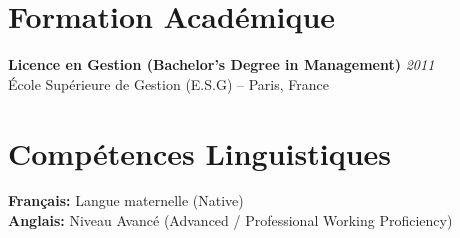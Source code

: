 \documentclass[11pt,a4paper]{article}
\begin{document}
\section*{Formation Académique}

\textbf{Licence en Gestion (Bachelor's Degree in Management)} \hfill \textit{2011}\\
École Supérieure de Gestion (E.S.G) -- Paris, France

\section*{Compétences Linguistiques}

\textbf{Français:} Langue maternelle (Native)\\
\textbf{Anglais:} Niveau Avancé (Advanced / Professional Working Proficiency)
\end{document}
